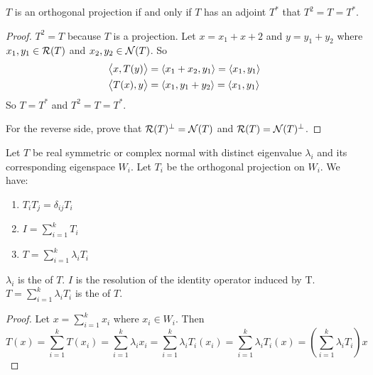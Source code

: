\begin{theorem}
    $T$ is an orthogonal projection if and only if $T$ has an adjoint $T^*$ that $T^2 = T = T^*$.
\end{theorem}
\begin{proof}
    $T^2 = T$ because $T$ is a projection. Let $x=x_1+x+2$ and $y=y_1+y_2$ where $x_1,y_1 \in \mathcal{R}(T)$ and $x_2,y_2 \in \mathcal{N}(T)$. So
    \begin{equation*}
        \begin{aligned}
            \left\langle \displaystyle x, T(y) \right\rangle &= \left\langle \displaystyle x_1 + x_2, y_1 \right\rangle = \left\langle \displaystyle x_1, y_1 \right\rangle \\
            \left\langle \displaystyle T(x), y \right\rangle &= \left\langle \displaystyle x_1, y_1 + y_2 \right\rangle = \left\langle \displaystyle x_1, y_1 \right\rangle
        \end{aligned}
    \end{equation*}
    So $T = T^*$ and $T^2 = T = T^*$.
    
    For the reverse side, prove that $\mathcal{R}(T)^\bot = \mathcal{N}(T)$ and $\mathcal{R}(T)= \mathcal{N}(T)^\bot$.
\end{proof}

\begin{theorem}
    Let $T$ be real symmetric or complex normal with distinct eigenvalue $\lambda_i$ and its corresponding eigenspace $W_i$. Let $T_i$ be the orthogonal projection on $W_i$. We have:
    \begin{enumerate}
        \item $T_i T_j = \delta_{ij} T_i$
        \item $\displaystyle I = \sum_{i=1}^k T_i$
        \item $\displaystyle T = \sum_{i=1}^k \lambda_i T_i$
    \end{enumerate}
    
    $\lambda_i$ is the  of $T$. $I$ is the resolution of the identity operator induced by T. $\displaystyle T = \sum_{i=1}^k \lambda_i T_i$ is the  of $T$.
\end{theorem}
\begin{proof}
    Let $\displaystyle x= \sum_{i=1}^k x_i$ where $x_i \in W_i$. Then
    \begin{equation*}
        T(x) = \sum_{i=1}^k T(x_i) = \sum_{i=1}^k \lambda_i x_i= \sum_{i=1}^k \lambda_i T_i (x_i) = \sum_{i=1}^k \lambda_i T_i (x) = \left(\sum_{i=1}^k \lambda_i T_i \right) x
    \end{equation*}
\end{proof}


